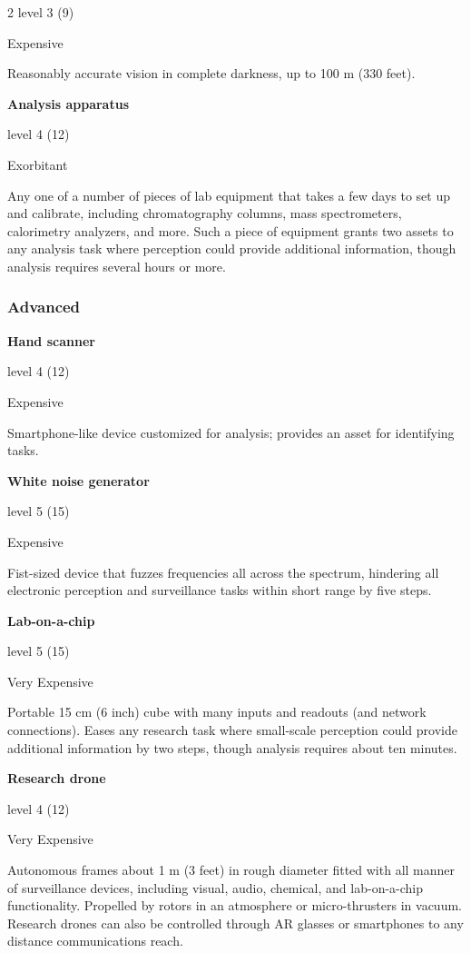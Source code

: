 \begin{multicols}{2}
level 3 (9) 

Expensive 

Reasonably accurate vision in complete darkness, up to 100 m (330 feet). 

\textbf{Analysis apparatus}

level 4 (12) 

Exorbitant 

Any one of a number of pieces of lab equipment that takes a few days to set up and calibrate, including chromatography columns, mass spectrometers, calorimetry analyzers, and more. Such a piece of equipment grants two assets to any analysis task where perception could provide additional information, though analysis requires several hours or more.

\subsubsection{Advanced}

\textbf{Hand scanner} 

level 4 (12) 

Expensive 

Smartphone-like device customized for analysis; provides an asset for identifying tasks. 

\textbf{White noise generator}

level 5 (15) 

Expensive 

Fist-sized device that fuzzes frequencies all across the spectrum, hindering all electronic perception and surveillance tasks within short range by five steps. 

\textbf{Lab-on-a-chip}

level 5 (15) 

Very Expensive 

Portable 15 cm (6 inch) cube with many inputs and readouts (and network connections). Eases any research task where small-scale perception could provide additional information by two steps, though analysis requires about ten minutes. 

\textbf{Research drone}

level 4 (12) 

Very Expensive 

Autonomous frames about 1 m (3 feet) in rough diameter fitted with all manner of surveillance devices, including visual, audio, chemical, and lab-on-a-chip functionality. Propelled by rotors in an atmosphere or micro-thrusters in vacuum. Research drones can also be controlled through AR glasses or smartphones to any distance communications reach. 


\end{multicols}
